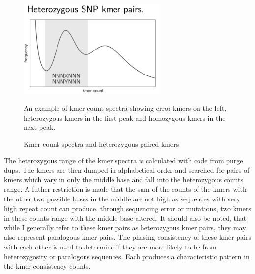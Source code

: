 \begin{figure}[htbp!]

\caption{Kmer count spectra and heterozygous paired kmers}
\label{figure:kmc}
\begin{centering}
\includegraphics[width=0.65\textwidth]{kmc.png}
\par{An example of kmer count spectra showing error kmers on the left, heterozygous kmers in the first peak and homozygous kmers in the next peak.}
\end{centering}
\end{figure}

\par{
The heterozygous range of the kmer spectra is calculated with code from purge dups\cite{purgedups}. The kmers are then dumped in alphabetical order and searched for pairs of kmers which vary in only the middle base and fall into the heterozygous counts range. A futher restriction is made that the sum of the counts of the kmers with the other two possible bases in the middle are not high as sequences with very high repeat count can produce, through sequencing error or mutations, two kmers in these counts range with the middle base altered. It should also be noted, that while I generally refer to these kmer pairs as heterozygous kmer pairs, they may also represent paralogous kmer pairs. The phasing consistency of these kmer pairs with each other is used to determine if they are more likely to be from heterozygosity or paralogous sequences. Each produces a characteristic pattern in the kmer consistency counts.
}

